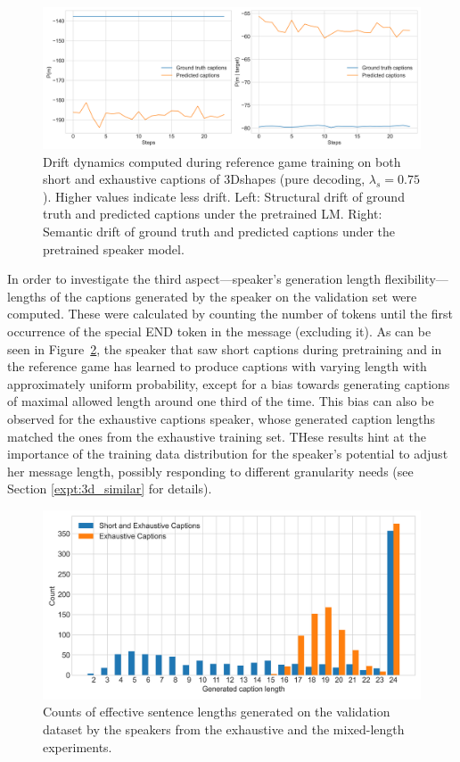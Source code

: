 \begin{figure}[h]
	\centering
	\includegraphics[width=\linewidth]{images/3dshapes_wShort_structural_semantic_drift_49_pure_075_random.png}
	\caption{Drift dynamics computed during reference game training on both short and exhaustive captions of 3Dshapes (pure decoding, $\lambda_s=0.75$). Higher values indicate less drift. Left: Structural drift of ground truth and predicted captions under the pretrained LM. Right: Semantic drift of ground truth and predicted captions under the pretrained speaker model.}
	\label{fig:3dshapes_wShort_075_str_sem_drift}
\end{figure}

In order to investigate the third aspect---speaker's generation length flexibility---lengths of the captions generated by the speaker on the validation set were computed. These were calculated by counting the number of tokens until the first occurrence of the special END token in the message (excluding it). As can be seen in Figure~\ref{fig:3dshapes_exh_short_random_lengths}, the speaker that saw short captions during pretraining and in the reference game has learned to produce captions with varying length with approximately uniform probability, except for a bias towards generating captions of maximal allowed length around one third of the time. This bias can also be observed for the exhaustive captions speaker, whose generated caption lengths matched the ones from the exhaustive training set. THese results hint at the importance of the training data distribution for the speaker's potential to adjust her message length, possibly responding to different granularity needs (see Section \ref{expt:3d_similar} for details). 

\begin{figure}[h]
	\centering
	\includegraphics[width=0.7\linewidth]{images/3dshapes_exh_short_random_length_counts.png}
	\caption{Counts of effective sentence lengths generated on the validation dataset by the speakers from the exhaustive and the mixed-length experiments.}
	\label{fig:3dshapes_exh_short_random_lengths}
\end{figure}

